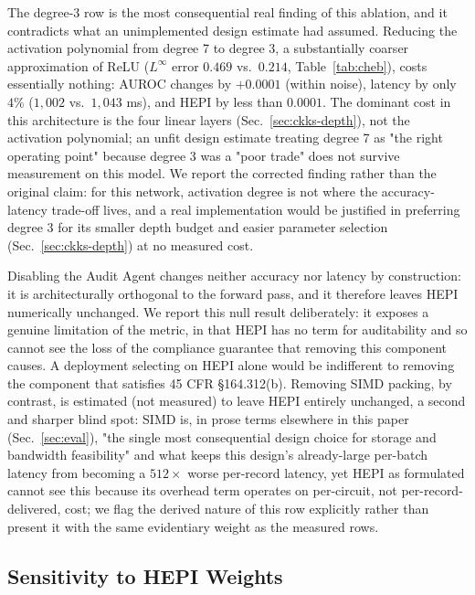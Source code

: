 \documentclass[journal,compsoc]{IEEEtran}
\newcommand{\HEPI}{\textsc{HEPI}}          %
\begin{document}
The degree-3 row is the most consequential real finding of this ablation, and
it contradicts what an unimplemented design estimate had assumed. Reducing
the activation polynomial from degree 7 to degree 3, a substantially
coarser approximation of ReLU ($L^\infty$ error $0.469$ vs.\ $0.214$,
Table~\ref{tab:cheb}), costs essentially nothing: AUROC changes by
$+0.0001$ (within noise), latency by only $4\%$ ($1{,}002$ vs.\ $1{,}043$ ms),
and \HEPI{} by less than $0.0001$. The dominant cost in this architecture is
the four linear layers (Sec.~\ref{sec:ckks-depth}), not the activation
polynomial; an unfit design estimate treating degree 7 as "the right
operating point" because degree 3 was a "poor trade" does not survive
measurement on this model. We report the corrected finding rather than the
original claim: for this network, activation degree is not where the
accuracy-latency trade-off lives, and a real implementation would be justified
in preferring degree 3 for its smaller depth budget and easier parameter
selection (Sec.~\ref{sec:ckks-depth}) at no measured cost.

Disabling the Audit Agent changes neither accuracy nor latency by
construction: it is architecturally orthogonal to the forward pass, and it
therefore leaves \HEPI{} numerically unchanged. We report this null result
deliberately: it exposes a genuine limitation of the metric, in that \HEPI{}
has no term for auditability and so cannot see the loss of the compliance
guarantee that removing this component causes. A deployment selecting on
\HEPI{} alone would be indifferent to removing the component that satisfies
45 CFR \S164.312(b). Removing SIMD packing, by contrast, is estimated (not
measured) to leave \HEPI{} entirely unchanged, a second and sharper blind
spot: SIMD is, in prose terms elsewhere in this paper (Sec.~\ref{sec:eval}),
"the single most consequential design choice for storage and bandwidth
feasibility" and what keeps this design's already-large per-batch latency
from becoming a $512\times$ worse per-record latency, yet \HEPI{} as
formulated cannot see this because its overhead term operates on
per-circuit, not per-record-delivered, cost; we flag the
derived nature of this row explicitly rather than present it with the same
evidentiary weight as the measured rows.

\subsection{Sensitivity to \HEPI{} Weights}
\end{document}
